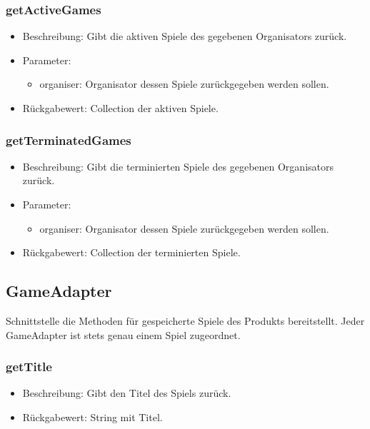 \documentclass[a4paper]{scrreprt}
\begin{document}
    \subsubsection{getActiveGames}
    \begin{itemize}
        \item Beschreibung: Gibt die aktiven Spiele des gegebenen Organisators zurück.
        \item Parameter:
        \begin{itemize}
            \item organiser: Organisator dessen Spiele zurückgegeben werden sollen.
        \end{itemize}
        \item Rückgabewert: Collection der aktiven Spiele.
    \end{itemize}

    \subsubsection{getTerminatedGames}
    \begin{itemize}
        \item Beschreibung: Gibt die terminierten Spiele des gegebenen Organisators zurück.
        \item Parameter:
        \begin{itemize}
            \item organiser: Organisator dessen Spiele zurückgegeben werden sollen.
        \end{itemize}
        \item Rückgabewert: Collection der terminierten Spiele.
    \end{itemize}

    \subsection{GameAdapter}
    Schnittstelle die Methoden für gespeicherte Spiele des Produkts bereitstellt.
    Jeder GameAdapter ist stets genau einem Spiel zugeordnet.

    \subsubsection{getTitle}
    \begin{itemize}
        \item Beschreibung: Gibt den Titel des Spiels zurück.
        \item Rückgabewert: String mit Titel.
    \end{itemize}
\end{document}
